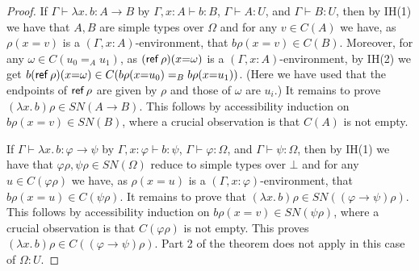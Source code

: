 \documentclass[10pt,a4paper]{article}
\newcommand{\lam}[2]{\lambda{#1.\,#2}}
\newcommand{\SN}{\mathit{SN}}
\newcommand{\Ref}{{\sf ref}}
\begin{document}
\begin{proof}
If $\Gamma\vdash\lam{x}{b}:A{\to}B$ by 
$\Gamma,x:A\vdash b:B$, $\Gamma \vdash A:U$, and $\Gamma \vdash B:U$,
then by IH(1) we have that $A,B$ are simple types over $\Omega$ and
for any $v\in C(A)$ we have, as $\rho(x{=}v)$ is a $(\Gamma,x:A)$-environment, 
that $b\rho(x{=}v)\in C(B)$. Moreover, for any $\omega\in C(u_0 =_A u_1)$,
as $(\Ref\,\rho)(x{=}\omega)$ is a $(\Gamma,x:A)$-environment,
by IH(2) we get $b(\Ref\,\rho)(x{=}\omega)\in C(b\rho(x{=}u_0) =_B b\rho(x{=}u_1))$.
(Here we have used that the endpoints of $\Ref\,\rho$ are 
given by $\rho$ and those of $\omega$ are $u_i$.)
It remains to prove $(\lam{x}{b})\rho\in\SN(A{\to}B)$.
This follows by accessibility induction on $b\rho(x{=}v)\in \SN(B)$,
where a crucial observation is that $C(A)$ is not empty.

If $\Gamma\vdash\lam{x}{b}:\varphi{\to}\psi$ by 
$\Gamma,x:\varphi\vdash b:\psi$, $\Gamma \vdash \varphi:\Omega$, 
and $\Gamma \vdash \psi:\Omega$,
then by IH(1) we have that $\varphi\rho,\psi\rho\in\SN(\Omega)$ 
reduce to simple types over $\bot$ and for any $u\in C(\varphi\rho)$ we have, 
as $\rho(x{=}u)$ is a $(\Gamma,x:\varphi)$-environment,
that $b\rho(x{=}u)\in C(\psi\rho)$. 
It remains to prove that $(\lam{x}{b})\rho\in\SN((\varphi{\to}\psi)\rho)$.
This follows by accessibility induction on $b\rho(x{=}v)\in \SN(\psi\rho)$,
where a crucial observation is that $C(\varphi\rho)$ is not empty.
This proves $(\lam{x}{b})\rho\in C((\varphi{\to}\psi)\rho)$.
Part 2 of the theorem does not apply in this case of $\Omega:U$.


\end{proof}
\end{document}
